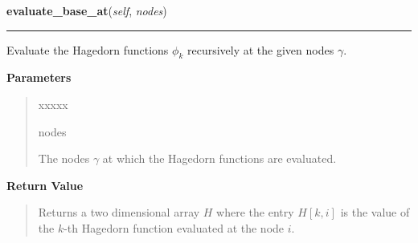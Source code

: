 \hspace{.8\funcindent}\begin{boxedminipage}{\funcwidth}

    \raggedright \textbf{evaluate\_base\_at}(\textit{self}, \textit{nodes})

    \vspace{-1.5ex}

    \rule{\textwidth}{0.5\fboxrule}
\setlength{\parskip}{2ex}
    Evaluate the Hagedorn functions $\phi_k$ recursively
    at the given nodes $\gamma$.

\setlength{\parskip}{1ex}
      \textbf{Parameters}
      \vspace{-1ex}

      \begin{quote}
        \begin{Ventry}{xxxxx}

          \item[nodes]

          The nodes $\gamma$ at which the Hagedorn
          functions are evaluated.

        \end{Ventry}

      \end{quote}

      \textbf{Return Value}
    \vspace{-1ex}

      \begin{quote}
      Returns a two dimensional array $H$ where the entry $H[k,i]$ is
      the value of the $k$-th Hagedorn function evaluated at the node
      $i$.

      \end{quote}

    \end{boxedminipage}

    \label{HagedornWavepacket:HagedornWavepacket:evaluate_at}

    \vspace{0.5ex}

